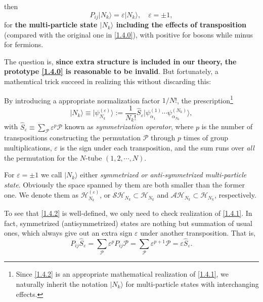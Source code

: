 \documentclass[b5paper,10pt,UTF8]{book}
\numberwithin{equation}{section}
\begin{document}
		then 
		\begin{equation}\label{1.4.1}
			P_{ij}|N_k\rangle=\varepsilon|N_k\rangle,\quad\varepsilon=\pm1,
		\end{equation}
		for \textbf{the multi-particle state $|N_k\rangle$ including the effects of transposition} (compared with the original one in \eqref{1.4.0}), with positive for bosons while minus for fermions.\par
 		The question is, \textbf{since extra structure is included in our theory, the prototype \eqref{1.4.0} is reasonable to be invalid}. But fortunately, a mathemtical trick succeed in realizing this without discarding this:
 		\begin{Def}
 			By introducing a appropriate normalization factor $1/N!$, the prescription\footnote{Since \eqref{1.4.2} is an appropriate mathematical realization of \eqref{1.4.1}, we naturally inherit the notation $|N_k\rangle$ for multi-particle states with interchanging effects.} 
 			\begin{equation}\label{1.4.2}
 				|N_k\rangle\equiv|\psi^{(\varepsilon)}_{N_k}\rangle:=\dfrac{1}{N_k!}\hat{S}_\varepsilon|\psi_{\alpha_1}^{(1)}\cdots\psi_{\alpha_{N_k}}^{(N_k)}\rangle,
 			\end{equation}
 			with $\displaystyle\hat{S}_{\varepsilon}\equiv\sum_\mathcal{P}\varepsilon^p\mathcal{P}$ known as \emph{symmetrization operator}, where $p$ is the number of transpositions constructing the permutation $\mathcal{P}$ through $p$ times of group multiplications, $\varepsilon$ is the sign under each transposition, and the sum runs over \emph{all} the permutation for the $N$-tube $(1,2,\cdots,N)$. 
 		\end{Def}
 		For $\varepsilon=\pm1$ we call $|N_k\rangle$ either \emph{symmetrized or anti-symmetrized multi-particle state}. Obviously the space spanned by them are both smaller than the former one. We denote them as $\mathcal{H}_{N_k}^{(\varepsilon)}$, or $\mathcal{SH}_{N_k}\subset\mathcal{H}_{N_k}$ and $\mathcal{AH}_{N_k}\subset\mathcal{H}_{N_k}$, respectively.\par
 		To see that \eqref{1.4.2} is well-defined, we only need to check realization of \eqref{1.4.1}. In fact, symmetrized (antisymmetrized) states are nothing but summation of usual ones, which always give out an extra sign $\varepsilon$ under another transposition. That is,
 		$$P_{ij}\hat{S}_\varepsilon=\sum_{\mathcal{P}}\varepsilon^p P_{ij}\mathcal{P}=\sum_{\mathcal{P}}\varepsilon^{p+1}\mathcal{P}=\varepsilon\hat{S}_\varepsilon.$$
 		
\end{document}

